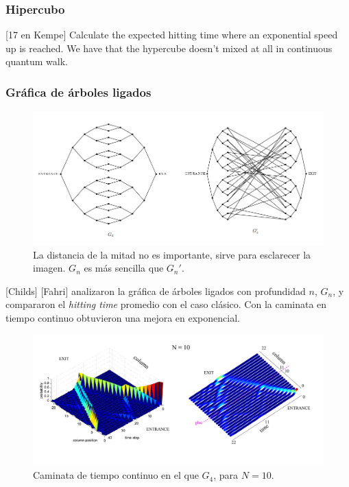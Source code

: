 \subsubsection*{Hipercubo}
[17 en Kempe] Calculate the expected hitting time where an exponential speed up is reached. 
We have that the hypercube doesn't mixed at all in continuous quantum walk.
\cite{marquezino2008mixing}
\subsubsection*{Gráfica de árboles ligados}

\begin{figure}[ht]
\centering
\includegraphics[width=1\textwidth]{Kap4/GluedTreesChilds.png}
\caption{La distancia de la mitad no es importante, sirve para esclarecer la imagen.  $G_n$ es más sencilla que $G_n'$.  \cite{childs2003exponential}}
\end{figure}

[Childs] [Fahri] analizaron la gráfica de árboles ligados con profundidad $n$, $G_n$, y compararon el \textit{hitting time} promedio con el caso clásico. Con la caminata en tiempo continuo obtuvieron una mejora en exponencial. 
\begin{figure}[ht]
\centering
\includegraphics[width=1\textwidth]{Kap4/GluedTreesCarneiro.png}
\caption{Caminata de tiempo continuo en el que $G_4$, para $N=10$. \cite{carneiro2005entanglement}}
\end{figure}

